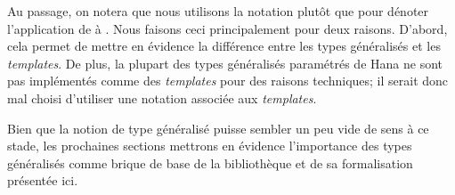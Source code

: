 Au passage, on notera que nous utilisons la notation 
plutôt que  pour dénoter l'application de
 à . Nous faisons ceci principalement pour deux
raisons. D'abord, cela permet de mettre en évidence la différence entre les
types généralisés et les \textit{templates}. De plus, la plupart des types
généralisés paramétrés de Hana ne sont pas implémentés comme des
\textit{templates} pour des raisons techniques; il serait donc mal
choisi d'utiliser une notation associée aux \textit{templates}.

Bien que la notion de type généralisé puisse sembler un peu vide de sens à
ce stade, les prochaines sections mettrons en évidence l'importance des types
généralisés comme brique de base de la bibliothèque et de sa formalisation
présentée ici.
